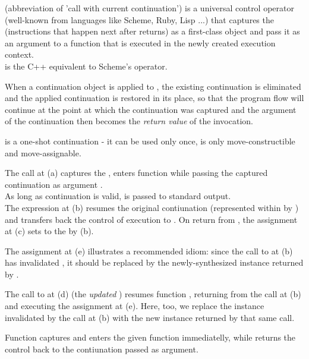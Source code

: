 
\cc (abbreviation of 'call with current continuation') is a universal control
operator (well-known from languages like Scheme, Ruby, Lisp ...) that captures
the \currcont (instructions that happen next after \cc returns) as a first-class
object and pass it as an argument to a function that is executed in the newly
created execution context.\\
\call is the C++ equivalent to Scheme's \cc operator.

When a continuation object is applied to \resume, the existing continuation is
eliminated and the applied continuation is restored in its place, so that the
program flow will continue at the point at which the continuation was captured
and the argument of the continuation then becomes the \emph{return value} of
the \call invocation.

\cont is a one-shot continuation - it can be used only once, is only
move-constructible and move-assignable.


The  call at (a) captures the \currcont, enters function
 while passing the captured continuation as argument .\\
As long as continuation  is valid,  is passed to standard
output.\\
The expression  at (b) resumes the original
contiunation (represented within  by ) and transfers back the
control of execution to . On return from ,
the assignment at (c) sets  to the \currcont by (b).

The assignment at (e) illustrates a recommended idiom: since the call to \call
at (b) has invalidated , it should be replaced by the newly-synthesized
\cont instance returned by \resume.

The call to  at (d) (the \emph{updated} )
resumes function , returning from the  call at (b) and
executing the assignment at (e). Here, too, we replace the \cont instance
 invalidated by the \resume call at (b) with the new instance
returned by that same \resume call.

Function \call captures \currcont and enters the given function immediatelly,
while \resume returns the control back to the contiunation passed as argument.\\

